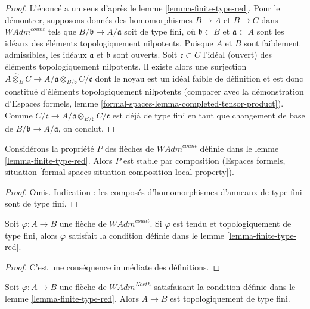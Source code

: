 \begin{proof}
L'énoncé a un sens d'après le lemme \ref{lemma-finite-type-red}.
Pour le démontrer, supposons donnés des homomorphismes $B \to A$ et $B \to C$
dans $\textit{WAdm}^{count}$ tels que $B/\mathfrak b \to A/\mathfrak a$
soit de type fini, où $\mathfrak b \subset B$ et $\mathfrak a \subset A$
sont les idéaux des éléments topologiquement nilpotents.
Puisque $A$ et $B$ sont faiblement admissibles, les idéaux
$\mathfrak a$ et $\mathfrak b$ sont ouverts.
Soit $\mathfrak c \subset C$ l'idéal (ouvert)
des éléments topologiquement nilpotents. Il existe alors une surjection
$A \widehat{\otimes}_B C \to
A/\mathfrak a \otimes_{B/\mathfrak b} C/\mathfrak c$
dont le noyau est un idéal faible de définition et est donc constitué
d'éléments topologiquement nilpotents
(comparer avec la démonstration d'Espaces formels,
lemme \ref{formal-spaces-lemma-completed-tensor-product}). Comme
$C/\mathfrak c \to A/\mathfrak a \otimes_{B/\mathfrak b} C/\mathfrak c$
est déjà de type fini en tant que changement de base de
$B/\mathfrak b \to A/\mathfrak a$, on conclut.
\end{proof}

\begin{lemma}
\label{lemma-composition-finite-type-red}
Considérons la propriété $P$ des flèches de $\textit{WAdm}^{count}$ définie
dans le lemme \ref{lemma-finite-type-red}. Alors $P$ est stable par composition
(Espaces formels, situation
\ref{formal-spaces-situation-composition-local-property}).
\end{lemma}

\begin{proof}
Omis. Indication : les composés d'homomorphismes d'anneaux de type fini sont
de type fini.
\end{proof}

\begin{lemma}
\label{lemma-finite-type-finite-type-red}
Soit $\varphi : A \to B$ une flèche de $\textit{WAdm}^{count}$.
Si $\varphi$ est tendu et topologiquement de type fini, alors $\varphi$
satisfait la condition définie dans le lemme \ref{lemma-finite-type-red}.
\end{lemma}

\begin{proof}
C'est une conséquence immédiate des définitions.
\end{proof}

\begin{lemma}
\label{lemma-Noetherian-finite-type-red}
Soit $\varphi : A \to B$ une flèche de $\textit{WAdm}^{Noeth}$
satisfaisant la condition définie dans le lemme \ref{lemma-finite-type-red}.
Alors $A \to B$ est topologiquement de type fini.
\end{lemma}

